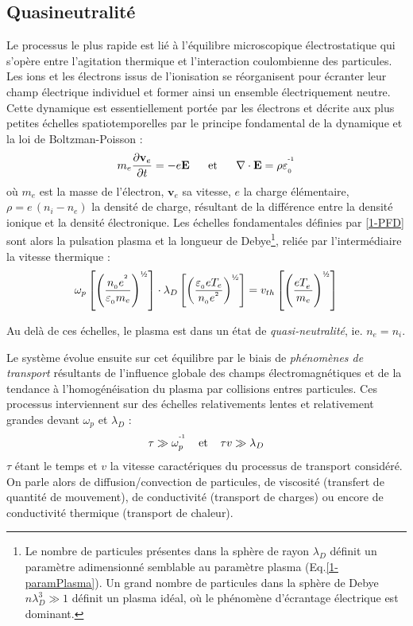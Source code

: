 \subsection{Quasineutralité}
Le processus le plus rapide est lié à
l'équilibre microscopique électrostatique qui s'opère
entre l'agitation thermique et l'interaction coulombienne des particules. Les
ions et les électrons issus de l'ionisation se réorganisent pour écranter
leur champ électrique individuel et former ainsi un ensemble électriquement neutre.
Cette dynamique est essentiellement portée par les électrons et décrite aux plus petites
échelles spatiotemporelles par le principe fondamental de la dynamique et la loi de Boltzman-Poisson :
\begin{align}
\label{1-PFD}
m_e\frac{\partial \mathbf{v}_e}{\partial t}=-e\mathbf E
\;\;\;\;\;\;\text{et}\;\;\;\;\;\;
\nabla\cdot\mathbf{E}=\rho\varepsilon_{_0}^{\operatorname{^{-1}}}
\end{align}
où $m_e$ est la masse de l'électron, $\mathbf{v}_e$ sa vitesse,
$e$ la charge élémentaire, $\rho=e\,(n_i-n_e)$ la densité de charge,
résultant de la différence entre la densité ionique et la densité
électronique.
Les échelles fondamentales définies par \ref{1-PFD} sont alors la pulsation
plasma et la longueur de Debye\footnote{Le nombre de particules présentes
dans la sphère de rayon $\lambda_D$ définit un paramètre adimensionné
semblable au paramètre plasma (Eq.\ref{1-paramPlasma}). Un
grand nombre de particules dans la sphère de Debye $n\lambda_D^3\gg1$
définit un plasma idéal, où le phénomène d'écrantage électrique est
dominant.}, reliée par l'intermédiaire la vitesse thermique :
\begin{equation}
\omega_p\left[\left(\frac{n_{_0}e^{^2}}{\varepsilon_{_0}
m_e}\right)^\text{\textonehalf}
\right]\cdot\lambda_D\left[\left(\frac{\varepsilon_{_0}
eT_e}{n_{_0}e^{^2}}\right)^\text{\textonehalf}\right]
=v_{th}\left[\left(\frac{eT_e^{^{\phantom{1}}}}{m_e}\right)^\text{\textonehalf}\right]
\end{equation}

Au delà de ces échelles, le plasma est dans un état de \emph{quasi-neutralité}, ie. $n_e=n_i$.

Le système évolue ensuite sur cet équilibre par le biais de
\emph{phénomènes de transport} résultants de l'influence
globale des champs électromagnétiques et de la tendance à
l'homogénéisation du plasma par collisions entres particules.
Ces processus interviennent sur des échelles relativements
lentes et relativement grandes devant $\omega_p$ et $\lambda_D$ :
\begin{equation}
\tau\gg \omega_p^{\operatorname{^{-1}}} \;\;\;\;\text{et}\;\;\;\;\tau v\gg\lambda_D
\end{equation}
$\tau$ étant le temps et $v$ la vitesse caractériques du processus de transport
considéré.
On parle alors de diffusion/convection de particules, de viscosité (transfert de
quantité de mouvement), de conductivité (transport de charges) ou encore de
conductivité thermique (transport de chaleur).


